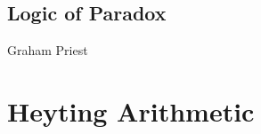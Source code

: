 \subsection{Logic of Paradox}\label{sec:logic_of_paradox}

Graham Priest



\section{Heyting Arithmetic}\label{sec:heyting_arithmetic}
